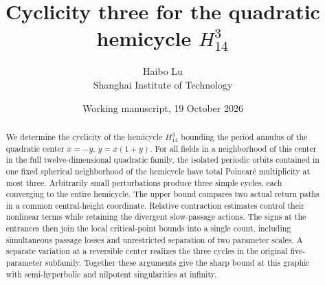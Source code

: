 \documentclass[11pt,a4paper]{article}
\title{Cyclicity three for the quadratic hemicycle $H_{14}^{3}$}
\author{Haibo Lu\\Shanghai Institute of Technology}
\date{Working manuscript, 19 October 2026}
\begin{document}
\maketitle
\begin{abstract}
We determine the cyclicity of the hemicycle $H_{14}^{3}$ bounding the
period annulus of the quadratic center $\dot x=-y$, $\dot y=x(1+y)$.
For all fields in a neighborhood of this center in the full
twelve-dimensional quadratic family, the isolated periodic orbits
contained in one fixed spherical neighborhood of the hemicycle have
total Poincar\'e multiplicity at most three. Arbitrarily small perturbations produce three
simple cycles, each converging to the entire hemicycle. The upper bound
compares two actual return paths in a common central-height coordinate.
Relative contraction estimates control their nonlinear terms while
retaining the divergent slow-passage actions. The signs at the entrances
then join the local critical-point bounds into a single count, including
simultaneous passage losses and unrestricted separation of two parameter
scales. A separate variation at a reversible center realizes the three
cycles in the original five-parameter subfamily. Together these arguments
give the sharp bound at this graphic with semi-hyperbolic and nilpotent
singularities at infinity.
\end{abstract}
\tableofcontents
\clearpage













\clearpage
\appendix

\clearpage

\clearpage

\clearpage


\end{document}
